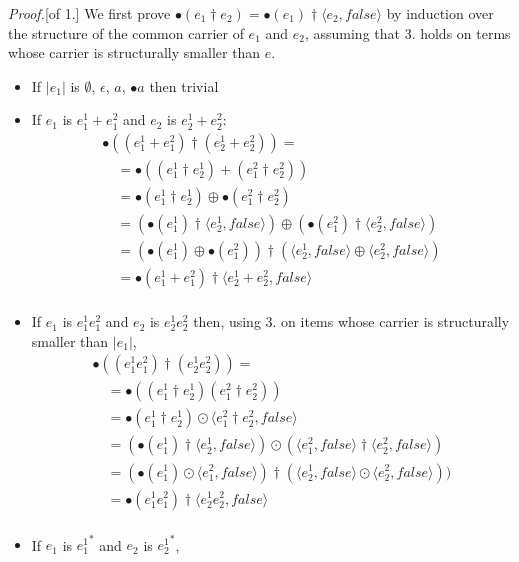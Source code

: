\documentclass[preprint]{sigplanconf}
\newcommand{\false}{\mathit{false}}
\newcounter{item}
\newenvironment{proof}{\begin{trivlist}\item[]{\em Proof.}}{\end{trivlist}}
\begin{document}
\begin{proof}[of 1.]
We first prove $\bullet(e_1 \dagger e_2) = \bullet(e_1) \dagger \langle e_2, \false \rangle$ by
induction over the structure of the common carrier of $e_1$ and $e_2$, assuming
that 3. holds on terms whose carrier is structurally smaller than $e$.

\begin{itemize}
\item If $|e_1|$ is $\emptyset$, $\epsilon$, $a$, $\bullet a$ then trivial
\item If $e_1$ is $e^1_1 + e^2_1$ and $e_2$ is $e^1_2 + e^2_2$:
\[\begin{array}{l}
\bullet((e^1_1 + e^2_1) \dagger (e^1_2 + e^2_2)) = \\
\quad = \bullet((e^1_1 \dagger e^1_2) + (e^2_1 \dagger e^2_2)) \\
\quad = \bullet(e^1_1 \dagger e^1_2) \oplus \bullet(e^2_1 \dagger e^2_2) \\
\quad = (\bullet(e^1_1) \dagger \langle e^1_2, \false \rangle) \oplus (\bullet(e^2_1) \dagger \langle e^2_2, \false \rangle) \\
\quad = (\bullet(e^1_1) \oplus \bullet(e^2_1)) \dagger (\langle e^1_2,\false \rangle \oplus \langle e^2_2, \false \rangle) \\
\quad = \bullet(e^1_1 + e^2_1) \dagger \langle e^1_2 + e^2_2, \false \rangle \\
\end{array}\]
\item If $e_1$ is $e^1_1 e^2_1$ and $e_2$ is $e^1_2 e^2_2$ then, using 3.
on items whose carrier is structurally smaller than $|e_1|$,
\[\begin{array}{l}
\bullet((e^1_1 e^2_1) \dagger (e^1_2 e^2_2)) = \\
\quad = \bullet((e^1_1 \dagger e^1_2) (e^2_1 \dagger e^2_2)) \\
\quad = \bullet(e^1_1 \dagger e^1_2) \odot \langle e^2_1 \dagger e^2_2, \false \rangle \\
\quad = (\bullet(e^1_1) \dagger \langle e^1_2,\false\rangle) \odot (\langle e^2_1, \false \rangle \dagger \langle e^2_2, \false \rangle) \\
\quad = (\bullet(e^1_1) \odot \langle e^2_1, \false \rangle) \dagger (\langle e^1_2, \false \rangle \odot \langle e^2_2, \false \rangle)) \\
\quad = \bullet(e^1_1 e^2_1) \dagger \langle e^1_2 e^2_2, \false \rangle \\
\end{array}\]
\item If $e_1$ is ${e^1_1}^*$ and $e_2$ is ${e^1_2}^*$,

\end{itemize}
\end{proof}
\end{document}
